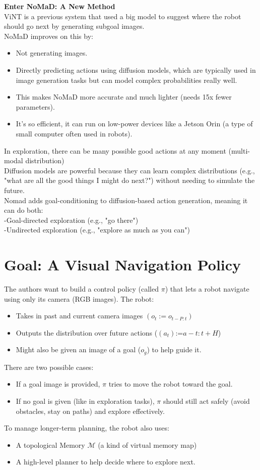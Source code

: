 \documentclass[12pt]{article}
\begin{document}
\textbf{Enter NoMaD: A New Method}\\
ViNT is a previous system that used a big model to suggest where the robot should go next by generating subgoal images.\\
NoMaD improves on this by:
\begin{itemize}
    \item Not generating images.
    \item Directly predicting actions using diffusion models, which are typically used in image generation tasks but can model complex probabilities really well.
    \item This makes NoMaD more accurate and much lighter (needs 15x fewer parameters).
    \item It’s so efficient, it can run on low-power devices like a Jetson Orin (a type of small computer often used in robots).
\end{itemize}
\bigskip
In exploration, there can be many possible good actions at any moment (multi-modal distribution)\\
Diffusion models are powerful because they can learn complex distributions (e.g., "what are all the good things I might do next?") without needing to simulate the future.\\
Nomad adds goal-conditioning to diffusion-based action generation, meaning it can do both:\\
-Goal-directed exploration (e.g., "go there")\\
-Undirected exploration (e.g., "explore as much as you can")\\
\section*{Goal: A Visual Navigation Policy}
The authors want to build a control policy (called $\pi$) that lets a robot navigate using only its camera (RGB images). The robot:
\begin{itemize}
    \item Takes in past and current camera images $(o_t := o_{t-P :t})$
    \item Outputs the distribution over future actions ($(a_t)$:=$a-{t:t+H}$)
    \item Might also be given an image of a goal ($o_g$) to help guide it.
\end{itemize}
There are two possible cases:
\begin{itemize}
    \item If a goal image is provided, $\pi$ tries to move the robot toward the goal.
    \item If no goal is given (like in exploration tasks), $\pi$ should still act safely (avoid obstacles, stay on paths) and explore effectively.
\end{itemize}
To manage longer-term planning, the robot also uses:
\begin{itemize}
    \item A topological Memory $\mathcal{M}$ (a kind of virtual memory map)
    \item A high-level planner to help decide where to explore next.
\end{itemize}
\end{document}
